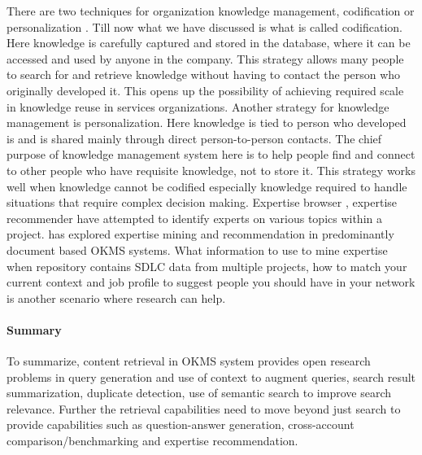 There are two techniques for organization knowledge management, codification or personalization \cite{hansen2000s}.
Till now what we have discussed is what is called codification. Here knowledge is carefully captured and stored in the database, where it can be accessed and used by anyone in the company. This strategy allows many people to search for and retrieve knowledge without having to contact the person who originally developed it. This opens up the possibility of achieving required scale in knowledge reuse in services organizations. Another strategy for knowledge management is personalization. Here knowledge is  tied to person who developed is and is shared mainly through direct person-to-person contacts. The chief purpose of knowledge management system here is to help people find and connect to other people who have requisite knowledge, not to store it. This strategy works well when knowledge cannot be codified especially knowledge required to handle situations that require complex decision making. Expertise browser \cite{Mockus:2002}, expertise recommender \cite{McDonald:2000} have attempted to identify experts on various topics within a project. \cite{Balog:2006} has explored expertise mining and recommendation in predominantly document based OKMS systems. What information to use to mine expertise when repository contains SDLC data from multiple projects, how to match your current context and job profile to suggest people you should have in your network is another scenario where research can help. 

\paragraph*{Summary} To summarize, content retrieval in OKMS system provides open research problems in query generation and use of context to augment queries, search result summarization, duplicate detection, use of semantic search to improve search relevance. Further the retrieval capabilities need to move beyond just search to provide capabilities such as question-answer generation, cross-account comparison/benchmarking and expertise recommendation.

